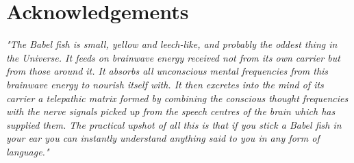 \chapter*{Acknowledgements}

{\em "The Babel fish is small, yellow and leech-like, and probably the oddest thing in the Universe. It feeds on brainwave energy received not from its own carrier but from those around it. It absorbs all unconscious mental frequencies from this brainwave energy to nourish itself with. It then excretes into the mind of its carrier a telepathic matrix formed by combining the conscious thought frequencies with the nerve signals picked up from the speech centres of the brain which has supplied them. The practical upshot of all this is that if you stick a Babel fish in your ear you can instantly understand anything said to you in any form of language."}~\cite{Adams2007}